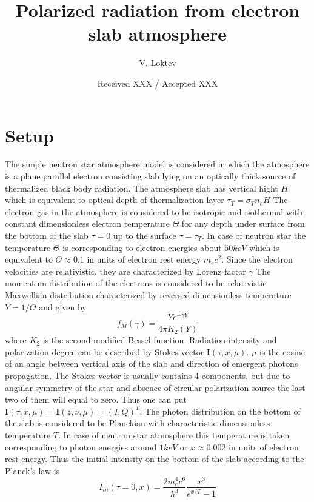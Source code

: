 \documentclass[iop, usenatbib]{emulateapj}
\newcommand{\be}{\begin{equation}}
\newcommand{\ee}{\end{equation}}
\begin{document}
\title{Polarized radiation from electron slab atmosphere}



\author{ V. Loktev }


\date{Received XXX / Accepted XXX}



\begin{abstract}
\lipsum[1]
\end{abstract}




\maketitle

\section{Setup}
The simple neutron star atmosphere model is considered in which the atmosphere is a plane parallel electron consisting slab lying on an optically thick source of thermalized  black body radiation.
The atmosphere slab has vertical hight $H$ which is equivalent to optical depth of thermalization layer $\tau_T=\sigma_Tn_eH$    
The electron gas in the atmosphere is considered to be isotropic and isothermal with constant dimensionless electron temperature $\Theta$ for any depth under surface from the bottom of the slab $\tau=0$ up to the surface $\tau=\tau_T$.
In case of neutron star the temperature $\Theta$ is corresponding to electron energies about $50 keV$ which is equivalent to $\Theta\approx 0.1$ in units of electron rest energy $m_ec^2$. 
Since the electron velocities are relativistic, they are characterized by Lorenz factor $\gamma$
The momentum distribution of the electrons is considered to be relativistic Maxwellian distribution characterized by reversed dimensionless temperature $Y = 1/ \Theta$ and given by 
\be 
\label{eq:Maxwell}
f_M(\gamma)= \frac{Y e^{-\gamma Y}}{4\pi K_2(Y)}
\ee
where $K_2$ is the second modified Bessel function.  
Radiation intensity and polarization degree can be described by Stokes vector $\bm{I}(\tau,x,\mu)$. $\mu$ is the cosine of an angle between vertical axis of the slab and direction of emergent photons propagation.  
The Stokes vector is usually contains 4 components, but due to angular symmetry of the star and absence of circular polarization source the last two of them will equal to zero.
Thus one can put $\bm{I}(\tau,x,\mu)=\bm{I}(z,\nu,\mu) = (I,Q)^T$.
The photon distribution on the bottom of the slab is considered to be Planckian with characteristic dimensionless temperature $T$.  In case of neutron star atmosphere this temperature is taken corresponding to photon energies around $1keV$ or $x\approx 0.002$ in  units of electron rest energy.
Thus the initial intensity on the bottom of the slab according to the Planck's law is
\be
I_{in}(\tau=0,x)=\frac{2m_e^4c^6}{h^3}\frac{x^3}{e^{x/T}-1}
\ee   
\end{document}
